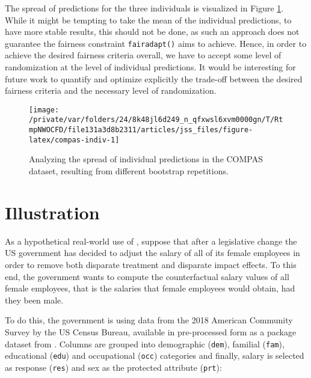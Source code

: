 \documentclass[
  nojss]{jss}
\begin{document}
The spread of predictions for the three individuals is visualized in
Figure \ref{fig:compas-indiv}. While it might be tempting to take the
mean of the individual predictions, to have more stable results, this
should not be done, as such an approach does not guarantee the fairness
constraint \texttt{fairadapt()} aims to achieve. Hence, in order to
achieve the desired fairness criteria overall, we have to accept some
level of randomization at the level of individual predictions. It would
be interesting for future work to quantify and optimize explicitly the
trade-off between the desired fairness criteria and the necessary level
of randomization.

\begin{CodeChunk}
\begin{figure}

{\centering \texttt{[image: /private/var/folders/24/8k48jl6d249\_n\_qfxwsl6xvm0000gn/T/RtmpNWOCFD/file131a3d8b2311/articles/jss\_files/figure-latex/compas-indiv-1]} 

}

\caption[Analyzing the spread of individual predictions in the COMPAS dataset, resulting from different bootstrap repetitions]{Analyzing the spread of individual predictions in the COMPAS dataset, resulting from different bootstrap repetitions.}\label{fig:compas-indiv}
\end{figure}
\end{CodeChunk}

\hypertarget{illustration}{%
\section{Illustration}\label{illustration}}

As a hypothetical real-world use of , suppose that after
a legislative change the US government has decided to adjust the salary
of all of its female employees in order to remove both disparate
treatment and disparate impact effects. To this end, the government
wants to compute the counterfactual salary values of all female
employees, that is the salaries that female employees would obtain, had
they been male.

To do this, the government is using data from the 2018 American
Community Survey by the US Census Bureau, available in pre-processed
form as a package dataset from . Columns are grouped into
demographic (\texttt{dem}), familial (\texttt{fam}), educational
(\texttt{edu}) and occupational (\texttt{occ}) categories and finally,
salary is selected as response (\texttt{res}) and sex as the protected
attribute (\texttt{prt}):
\end{document}
